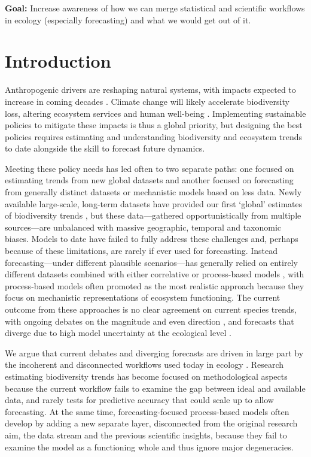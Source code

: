 \documentclass[11pt]{article}
\begin{document}
{\noindent \bf Goal:} Increase awareness of how we can merge statistical and scientific workflows in ecology (especially forecasting) and what we would get out of it.
\vspace*{0.5cm}

\section{Introduction}

Anthropogenic drivers are reshaping natural systems, with impacts expected to increase in coming decades \citep{Diaz2019}. Climate change will likely accelerate biodiversity loss, altering ecosystem services and human well-being \citep{IPBES2019}. Implementing sustainable policies to mitigate these impacts is thus a global priority, but designing the best policies requires estimating and understanding biodiversity and ecosystem trends to date alongside the skill to forecast future dynamics. %

Meeting these policy needs has led often to two separate paths: one focused on estimating trends from new global datasets and another focused on forecasting from generally distinct datasets or mechanistic models based on less data. Newly available large-scale, long-term datasets have provided our first `global' estimates of biodiversity trends \citep[e.g.][]{Dornelas2018}, but these data---gathered opportunistically from multiple sources---are unbalanced with massive geographic, temporal and taxonomic biases. Models to date have failed to fully address these challenges and, perhaps because of these limitations, are rarely if ever used for forecasting. 
Instead forecasting---under different plausible scenarios---has generally relied on entirely different datasets combined with either correlative or process-based models \citep{IPBES2019}, with process-based models often promoted as the most realistic approach \citep{Urban2016, Pilowsky2022} because they focus on mechanistic representations of ecosystem functioning. The current outcome from these approaches is no clear agreement on current species trends, with ongoing debates on the magnitude and even direction \citep{Dornelas2014, Leung2020, Buschke2021, Johnson2024}, and forecasts that diverge due to high model uncertainty at the ecological level \citep{Cheaib2012}. 

We argue that current debates and diverging forecasts are driven in large part by the incoherent and disconnected workflows used today in ecology \citep{Loreau2022, Talis2023, Johnson2024}. Research estimating biodiversity trends has become focused on methodological aspects because the current workflow fails to examine the gap between ideal and available data, and rarely tests for predictive accuracy that could scale up to allow forecasting. At the same time, forecasting-focused process-based models often develop by adding a new separate layer, disconnected from the original research aim, the data stream and the previous scientific insights, because they fail to examine the model as a functioning whole and thus ignore major degeneracies. 
\end{document}
